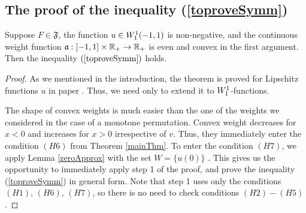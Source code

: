 \subsection{The proof of the inequality (\ref{toproveSymm})}
\label{sobolevSymm}

\begin{thm}
\label{symmThm}
Suppose $F \in \mathfrak{F}$, the function $u \in W_1^1(-1, 1)$ is non-negative,
and the continuous weight function $\mathfrak a: [-1, 1] \times \mathbb R_+ \to \mathbb R_+$
is even and convex in the first argument.
Then the inequality $(\ref{toproveSymm})$ holds.
\end{thm}

\begin{proof}
As we mentioned in the introduction,
the theorem is proved for Lipschitz functions $u$ in paper \cite{Br}.
Thus, we need only to extend it to $W_1^1$-functions.

The shape of convex weights is much easier
than the one of the weights we considered in the case of a monotone permutation.
Convex weight decreases for $x < 0$ and increases for $x > 0$
irrespective of $v$.
Thus, they immediately enter the condition $(H6)$ from Theorem \ref{mainThm}.
To enter the condition $(H7)$, we apply Lemma \ref{zeroApprox}
with the set $W = \{ u(0) \}$ .
This gives us the opportunity to immediately apply step 1 of the proof,
and prove the inequality (\ref{toproveSymm}) in general form.
Note that step 1 uses only the conditions $(H1)$, $(H6)$, $(H7)$,
so there is no need to check conditions $(H2)-(H5)$.
\end{proof}
